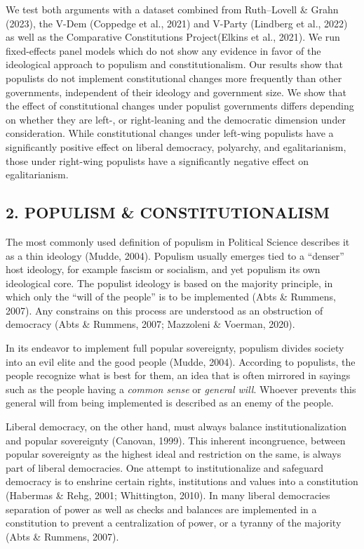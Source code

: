 \documentclass[
  abstract]{article}
\begin{document}
We test both arguments with a dataset combined from Ruth--Lovell \&
Grahn (2023), the V-Dem (Coppedge et al., 2021) and V-Party (Lindberg et
al., 2022) as well as the Comparative Constitutions Project(Elkins et
al., 2021). We run fixed-effects panel models which do not show any
evidence in favor of the ideological approach to populism and
constitutionalism. Our results show that populists do not implement
constitutional changes more frequently than other governments,
independent of their ideology and government size. We show that the
effect of constitutional changes under populist governments differs
depending on whether they are left-, or right-leaning and the democratic
dimension under consideration. While constitutional changes under
left-wing populists have a significantly positive effect on liberal
democracy, polyarchy, and egalitarianism, those under right-wing
populists have a significantly negative effect on egalitarianism.

\hypertarget{populism-constitutionalism}{%
\subsection{2. POPULISM \&
CONSTITUTIONALISM}\label{populism-constitutionalism}}

The most commonly used definition of populism in Political Science
describes it as a thin ideology (Mudde, 2004). Populism usually emerges
tied to a ``denser'' host ideology, for example fascism or socialism,
and yet populism its own ideological core. The populist ideology is
based on the majority principle, in which only the ``will of the
people'' is to be implemented (Abts \& Rummens, 2007). Any constrains on
this process are understood as an obstruction of democracy (Abts \&
Rummens, 2007; Mazzoleni \& Voerman, 2020).

In its endeavor to implement full popular sovereignty, populism divides
society into an evil elite and the good people (Mudde, 2004). According
to populists, the people recognize what is best for them, an idea that
is often mirrored in sayings such as the people having a \emph{common
sense} or \emph{general will}. Whoever prevents this general will from
being implemented is described as an enemy of the people.

Liberal democracy, on the other hand, must always balance
institutionalization and popular sovereignty (Canovan, 1999). This
inherent incongruence, between popular sovereignty as the highest ideal
and restriction on the same, is always part of liberal democracies. One
attempt to institutionalize and safeguard democracy is to enshrine
certain rights, institutions and values into a constitution (Habermas \&
Rehg, 2001; Whittington, 2010). In many liberal democracies separation
of power as well as checks and balances are implemented in a
constitution to prevent a centralization of power, or a tyranny of the
majority (Abts \& Rummens, 2007).
\end{document}
